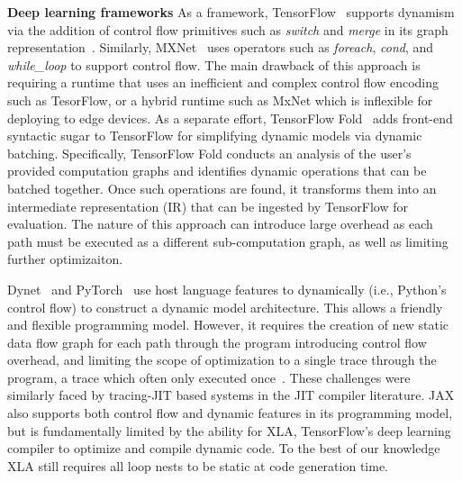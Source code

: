 \noindent
{\bf Deep learning frameworks} As a framework, TensorFlow~\citep{tensorflow} supports dynamism via the addition of control flow primitives such as \emph{switch} and \emph{merge} in its graph representation~\citep{yu2018dynamic}. Similarly, MXNet~\citep{mxnet, mxnet-control} uses operators such as {\em foreach}, {\em cond}, and {\em while\_loop} to support control flow. The main drawback of this approach is requiring a runtime that uses an inefficient and complex control flow encoding such as TesorFlow, or a hybrid runtime such as MxNet which is inflexible for deploying to edge devices. As a separate effort, TensorFlow Fold~\citep{tensorflowfold} adds front-end syntactic sugar to TensorFlow for simplifying dynamic models via dynamic batching. Specifically, TensorFlow Fold conducts an analysis of the user's provided computation graphs and identifies dynamic operations that can be batched together. Once such operations are found, it transforms them into an intermediate representation (IR) that can be ingested by TensorFlow for evaluation. The nature of this approach can introduce large overhead as each path must be executed as a different sub-computation graph, as well as limiting further optimizaiton.

Dynet~\citep{neubig2017dynet} and PyTorch~\citep{pytorch} use host language features to dynamically (i.e., Python's control flow) to construct a dynamic model architecture. This allows a friendly and flexible programming model.
However, it requires the creation of new static data flow graph for each path through the program introducing control flow overhead, and limiting the scope of optimization to a single trace through the program, a trace which often only executed once~\citep{xu2018cavs}. These challenges were similarly faced by tracing-JIT based systems in the JIT compiler literature. JAX~\citep{jax2018github} also supports both control flow and dynamic features in its programming model, but is fundamentally limited by the ability for XLA, TensorFlow's deep learning compiler to optimize and compile dynamic code. To the best of our knowledge XLA still requires all loop nests to be static at code generation time.

